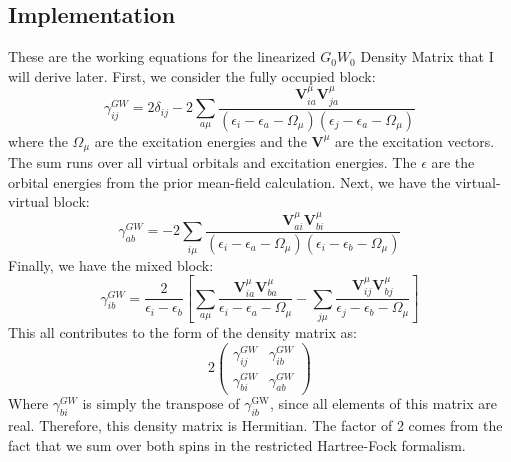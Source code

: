 \documentclass[12pt]{caltech_thesis}
\begin{document}
\subsection{Implementation}
These are the working equations for the linearized $G_0W_0$ Density Matrix that I will derive later. \autocite{bruneval_assessment_2019} First, we consider the fully occupied block:
\begin{equation}
\gamma_{i j}^{G W}=2\delta_{i j}-2\sum_{a \mu} \frac{\textbf{V}_{i a}^\mu \textbf{V}_{ja}^\mu}{\left(\epsilon_{i}-\epsilon_{a}-\Omega_{\mu}\right)\left(\epsilon_{j}-\epsilon_{a}-\Omega_{\mu}\right)}
\end{equation}
where the $\Omega_{\mu}$ are the excitation energies and the $\textbf{V}^{\mu}$ are the excitation vectors. The sum runs over all virtual orbitals and excitation energies. The $\epsilon$ are the orbital energies from the prior mean-field calculation. Next, we have the virtual-virtual block:
\begin{equation}
\gamma_{a b}^{G W}=-2\sum_{i \mu } \frac{\textbf{V}_{a i}^{\mu} \textbf{V}_{b i}^{\mu}}{\left(\epsilon_{i}-\epsilon_{a}-\Omega_{\mu}\right)\left(\epsilon_{i}-\epsilon_{b}-\Omega_{\mu}\right)}
\end{equation}
Finally, we have the mixed block:
\begin{equation}
    \gamma_{i b}^{G W}=\frac{2}{\epsilon_{i}-\epsilon_{b}}\left[ \sum_{a \mu} \frac{\textbf{V}_{i a}^{\mu} \textbf{V}_{b a}^{\mu}}{\epsilon_{i}-\epsilon_{a}-\Omega_{\mu}} - \sum_{j \mu} \frac{\textbf{V}_{i j}^{\mu} \textbf{V}_{bj}^{\mu}}{\epsilon_{j}-\epsilon_{b}-\Omega_{\mu}} \right]
\end{equation}
This all contributes to the form of the density matrix as:
\begin{equation}
    2\begin{pmatrix}
        \gamma _{i j}^{G W} & \gamma _{i b}^{G W} \\
        \gamma _{bi}^{G W } & \gamma _{a b}^{G W}
    \end{pmatrix}
\end{equation}
Where $\gamma _{bi}^{G W }$ is simply the transpose of $\gamma _{ib}^{\text{GW}}$, since all elements of this matrix are real. Therefore, this density matrix is Hermitian. The factor of 2 comes from the fact that we sum over both spins in the restricted Hartree-Fock formalism.
\newpage
\end{document}

